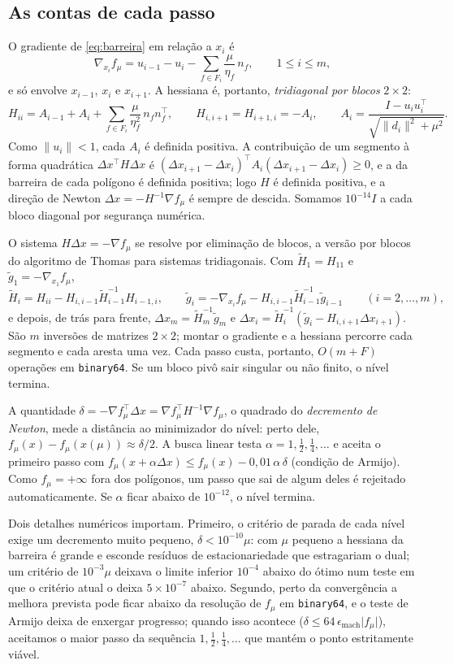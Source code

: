 \documentclass[11pt,a4paper]{article}
\theoremstyle{plain}\newtheorem{proposicao}{Proposição}
\theoremstyle{definition}\newtheorem{definicao}{Definição}
\theoremstyle{plain}\newtheorem{teorema}{Teorema}
\newcommand{\norm}[1]{\lVert#1\rVert}
\newcommand{\abs}[1]{\lvert#1\rvert}
\begin{document}
\subsection{As contas de cada passo}
O gradiente de \eqref{eq:barreira} em relação a \(x_i\) é
\[
\nabla_{x_i}f_\mu=u_{i-1}-u_i-\sum_{f\in F_i}\frac{\mu}{\eta_f}\,n_f,\qquad 1\le i\le m,
\]
e só envolve \(x_{i-1}\), \(x_i\) e \(x_{i+1}\). A hessiana é, portanto, \emph{tridiagonal por blocos} \(2\times2\):
\[
H_{ii}=A_{i-1}+A_i+\sum_{f\in F_i}\frac{\mu}{\eta_f^2}\,n_fn_f^{\top},\qquad H_{i,i+1}=H_{i+1,i}=-A_i,\qquad A_i=\frac{I-u_iu_i^{\top}}{\sqrt{\norm{d_i}^2+\mu^2}}.
\]
Como \(\norm{u_i}<1\), cada \(A_i\) é definida positiva. A contribuição de um segmento à forma quadrática \(\Delta x^{\top}H\Delta x\) é \((\Delta x_{i+1}-\Delta x_i)^{\top}A_i(\Delta x_{i+1}-\Delta x_i)\ge0\), e a da barreira de cada polígono é definida positiva; logo \(H\) é definida positiva, e a direção de Newton \(\Delta x=-H^{-1}\nabla f_\mu\) é sempre de descida. Somamos \(10^{-14}I\) a cada bloco diagonal por segurança numérica.

O sistema \(H\Delta x=-\nabla f_\mu\) se resolve por eliminação de blocos, a versão por blocos do algoritmo de Thomas para sistemas tridiagonais. Com \(\tilde H_1=H_{11}\) e \(\tilde g_1=-\nabla_{x_1}f_\mu\),
\[
\tilde H_i=H_{ii}-H_{i,i-1}\tilde H_{i-1}^{-1}H_{i-1,i},\qquad \tilde g_i=-\nabla_{x_i}f_\mu-H_{i,i-1}\tilde H_{i-1}^{-1}\tilde g_{i-1}\qquad(i=2,\dots,m),
\]
e depois, de trás para frente, \(\Delta x_m=\tilde H_m^{-1}\tilde g_m\) e \(\Delta x_i=\tilde H_i^{-1}(\tilde g_i-H_{i,i+1}\Delta x_{i+1})\). São \(m\) inversões de matrizes \(2\times2\); montar o gradiente e a hessiana percorre cada segmento e cada aresta uma vez. Cada passo custa, portanto, \(O(m+F)\) operações em \texttt{binary64}. Se um bloco pivô sair singular ou não finito, o nível termina.

A quantidade \(\delta=-\nabla f_\mu^{\top}\Delta x=\nabla f_\mu^{\top}H^{-1}\nabla f_\mu\), o quadrado do \emph{decremento de Newton}, mede a distância ao minimizador do nível: perto dele, \(f_\mu(x)-f_\mu(x(\mu))\approx\delta/2\). A busca linear testa \(\alpha=1,\frac12,\frac14,\dots\) e aceita o primeiro passo com \(f_\mu(x+\alpha\Delta x)\le f_\mu(x)-0{,}01\,\alpha\,\delta\) (condição de Armijo). Como \(f_\mu=+\infty\) fora dos polígonos, um passo que sai de algum deles é rejeitado automaticamente. Se \(\alpha\) ficar abaixo de \(10^{-12}\), o nível termina.

Dois detalhes numéricos importam. Primeiro, o critério de parada de cada nível exige um decremento muito pequeno, \(\delta<10^{-10}\mu\): com \(\mu\) pequeno a hessiana da barreira é grande e esconde resíduos de estacionariedade que estragariam o dual; um critério de \(10^{-3}\mu\) deixava o limite inferior \(10^{-4}\) abaixo do ótimo num teste em que o critério atual o deixa \(5\times10^{-7}\) abaixo. Segundo, perto da convergência a melhora prevista pode ficar abaixo da resolução de \(f_\mu\) em \texttt{binary64}, e o teste de Armijo deixa de enxergar progresso; quando isso acontece (\(\delta\le64\,\epsilon_{\text{mach}}\abs{f_\mu}\)), aceitamos o maior passo da sequência \(1,\frac12,\frac14,\dots\) que mantém o ponto estritamente viável.
\end{document}
